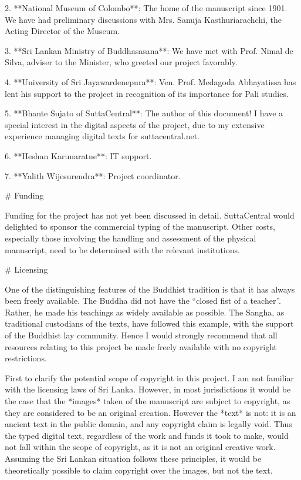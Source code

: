 \documentclass[11pt, openany,a5paper]{article}
\begin{document}
\begin{markdown}
2. **National Museum of Colombo**:  The home of the manuscript since 1901. We have had preliminary discussions with Mrs. Sanuja Kasthuriarachchi, the Acting Director of the Museum.

3. **Sri Lankan Ministry of Buddhasasana**:  We have met with Prof. Nimal de Silva, adviser to the Minister, who greeted our project favorably.

4. **University of Sri Jayawardenepura**:  Ven. Prof. Medagoda Abhayatissa has lent his support to the project in recognition of its importance for Pali studies.

5. **Bhante Sujato of SuttaCentral**:  The author of this document! I have a special interest in the digital aspects of the project, due to my extensive experience managing digital texts for suttacentral.net.

6. **Heshan Karunaratne**:  IT support.

7. **Yalith Wijesurendra**:  Project coordinator.

# Funding

Funding for the project has not yet been discussed in detail. SuttaCentral would delighted to sponsor the commercial typing of the manuscript. Other costs, especially those involving the handling and assessment of the physical manuscript, need to be determined with the relevant institutions.

# Licensing

One of the distinguishing features of the Buddhist tradition is that it has always been freely available. The Buddha did not have the “closed fist of a teacher”. Rather, he made his teachings as widely available as possible. The Sangha, as traditional custodians of the texts, have followed this example, with the support of the Buddhist lay community. Hence I would strongly recommend that all resources relating to this project be made freely available with no copyright restrictions.

First to clarify the potential scope of copyright in this project. I am not familiar with the licensing laws of Sri Lanka. However, in most jurisdictions it would be the case that the *images* taken of the manuscript are subject to copyright, as they are considered to be an original creation. However the *text* is not: it is an ancient text in the public domain, and any copyright claim is legally void. Thus the typed digital text, regardless of the work and funds it took to make, would not fall within the scope of copyright, as it is not an original creative work. Assuming the Sri Lankan situation follows these principles, it would be theoretically possible to claim copyright over the images, but not the text.


\end{markdown}
\end{document}
